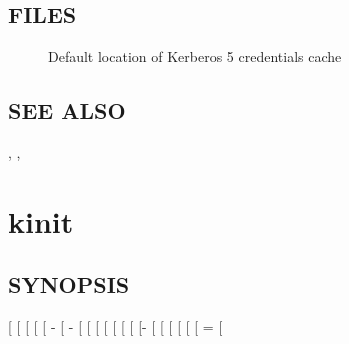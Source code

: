 \documentclass[letterpaper,10pt,english]{sphinxmanual}
\begin{document}
\subsection{FILES}
\label{\detokenize{user/user_commands/kdestroy:files}}\begin{description}
\item[{}] \leavevmode
Default location of Kerberos 5 credentials cache

\end{description}


\subsection{SEE ALSO}
\label{\detokenize{user/user_commands/kdestroy:see-also}}
{\hyperref[\detokenize{user/user_commands/kinit:kinit-1}]{}}, {\hyperref[\detokenize{user/user_commands/klist:klist-1}]{}}, {\hyperref[\detokenize{user/user_config/kerberos:kerberos-7}]{}}


\section{kinit}
\label{\detokenize{user/user_commands/kinit:kinit-1}}\label{\detokenize{user/user_commands/kinit:kinit}}\label{\detokenize{user/user_commands/kinit::doc}}

\subsection{SYNOPSIS}
\label{\detokenize{user/user_commands/kinit:synopsis}}
{[}\sphinxstylestrong{-V}{]}
{[} \sphinxstyleemphasis{lifetime}{]}
{[} \sphinxstyleemphasis{start\_time}{]}
{[} \sphinxstyleemphasis{renewable\_life}{]}
{[} \textbar{} -\sphinxstylestrong{P}{]}
{[} \textbar{} -\sphinxstylestrong{F}{]}
{[}\sphinxstylestrong{-a}{]}
{[}\sphinxstylestrong{-A}{]}
{[}\sphinxstylestrong{-C}{]}
{[}\sphinxstylestrong{-E}{]}
{[}\sphinxstylestrong{-v}{]}
{[}\sphinxstylestrong{-R}{]}
{[} {[}- \sphinxstyleemphasis{keytab\_file}{]}{]}
{[} \sphinxstyleemphasis{cache\_name}{]}
{[}\sphinxstylestrong{-n}{]}
{[} \sphinxstyleemphasis{service\_name}{]}
{[} \sphinxstyleemphasis{input\_ccache}{]}
{[} \sphinxstyleemphasis{armor\_ccache}{]}
{[} \sphinxstyleemphasis{attribute}{[}=\sphinxstyleemphasis{value}{]}{]}
{[}\sphinxstyleemphasis{principal}{]}
\end{document}
